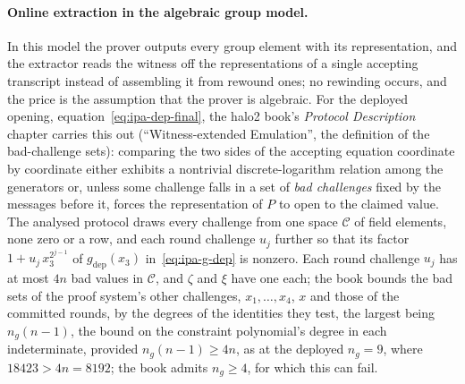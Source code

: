 \documentclass[11pt,a4paper]{article}
\theoremstyle{definition}
\begin{document}
\paragraph{Online extraction in the algebraic group model.}
In this model the prover outputs every group element with its
representation, and the extractor reads the witness off the
representations of a single accepting transcript instead of assembling
it from rewound ones; no rewinding occurs, and the price is the
assumption that the prover is algebraic. For the deployed opening,
equation~\eqref{eq:ipa-dep-final}, the halo2 book's \emph{Protocol
Description} chapter carries this out (``Witness-extended Emulation'', the
definition of the bad-challenge sets): comparing the two sides of the
accepting equation coordinate by coordinate either exhibits a
nontrivial discrete-logarithm relation among the generators or, unless
some challenge falls in a set of \emph{bad challenges} fixed by the
messages before it, forces the representation of $P$ to open to the
claimed value. The analysed protocol draws every challenge from one
space $\mathcal C$ of field elements, none zero or a row, and each round
challenge $u_j$ further so that its factor $1 + u_j\,x_3^{2^{j-1}}$
of $g_{\mathrm{dep}}(x_3)$ in~\eqref{eq:ipa-g-dep} is nonzero. Each round
challenge $u_j$ has at most $4n$ bad values in $\mathcal C$, and $\zeta$
and $\xi$ have one each; the book bounds the bad sets of the proof
system's other challenges, $x_1, \dots, x_4$, $x$ and those of the
committed rounds, by the degrees of the identities they test, the
largest being $n_g(n - 1)$, the bound on the constraint polynomial's
degree in each indeterminate, provided $n_g(n - 1) \ge 4n$, as at the
deployed $n_g = 9$, where $18423 > 4n = 8192$; the book admits
$n_g \ge 4$, for which this can fail.
\end{document}
